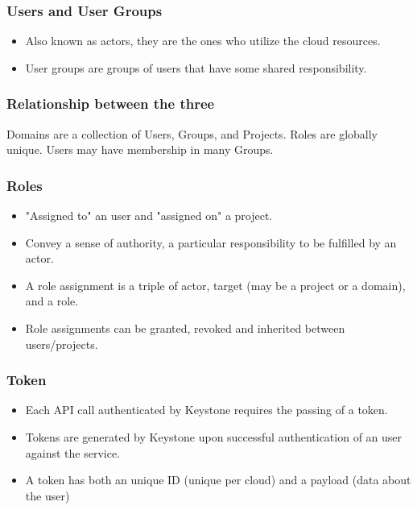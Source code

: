 \documentclass{article}
\begin{document}
\subsubsection{Users and User Groups}
\begin{itemize}
    \item Also known as actors, they are the ones who utilize the cloud resources. 
    
    \item User groups are groups of users that have some shared responsibility. 
\end{itemize}

\subsubsection{Relationship between the three}
Domains are a collection of Users, Groups, and Projects. Roles are globally
unique. Users may have membership in many Groups.

\subsubsection{Roles}
\begin{itemize}
    \item "Assigned to" an user and "assigned on" a project. 
    
    \item Convey a sense of authority, a particular responsibility to be fulfilled by an actor. 
    
    \item A role assignment is a triple of actor, target (may be a project or a domain), and a role.
    
    \item Role assignments can be granted, revoked and inherited between users/projects. 
\end{itemize}

\subsubsection{Token}
\begin{itemize}
    \item Each API call authenticated by Keystone requires the passing of a token. 
    
    \item Tokens are generated by Keystone upon successful authentication of an user against the service. 
    
    \item A token has both an unique ID (unique per cloud) and a payload (data about the user)
\end{itemize}
\end{document}
